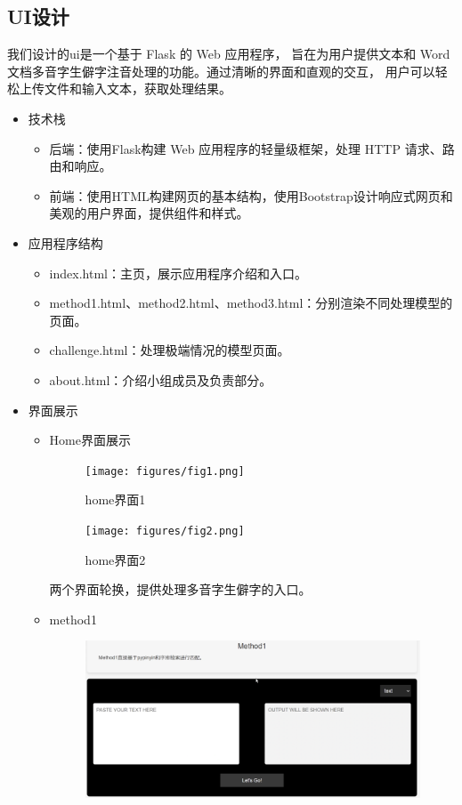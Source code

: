 \documentclass[12pt,hyperref,a4paper,UTF8]{ctexart}
\begin{document}
\subsection{UI设计}
我们设计的ui是一个基于 Flask 的 Web 应用程序，
旨在为用户提供文本和 Word 文档多音字生僻字注音处理的功能。通过清晰的界面和直观的交互，
用户可以轻松上传文件和输入文本，获取处理结果。
\begin{itemize}
    \item 技术栈
    \begin{itemize}
        \item 后端：使用Flask构建 Web 应用程序的轻量级框架，处理 HTTP 请求、路由和响应。
        \item 前端：使用HTML构建网页的基本结构，使用Bootstrap设计响应式网页和美观的用户界面，提供组件和样式。
    \end{itemize}
    \item 应用程序结构
    \begin{itemize}
        \item index.html：主页，展示应用程序介绍和入口。
        \item method1.html、method2.html、method3.html：分别渲染不同处理模型的页面。
        \item challenge.html：处理极端情况的模型页面。
        \item about.html：介绍小组成员及负责部分。
    \end{itemize}
    \item 界面展示
    \begin{itemize}
        \item Home界面展示
        \begin{figure}[H]
            \centering
            \texttt{[image: figures/fig1.png]}
            \caption{home界面1}
            \label{fig1}
        \end{figure}
        \begin{figure}[H]
            \centering
            \texttt{[image: figures/fig2.png]}
            \caption{home界面2}
            \label{fig2}
        \end{figure}
        两个界面轮换，提供处理多音字生僻字的入口。
        \item method1
        \begin{figure}[H]
            \centering
            \includegraphics[width=0.7\linewidth]{figures/fig3.png}

\end{figure}
\end{itemize}
\end{itemize}
\end{document}
